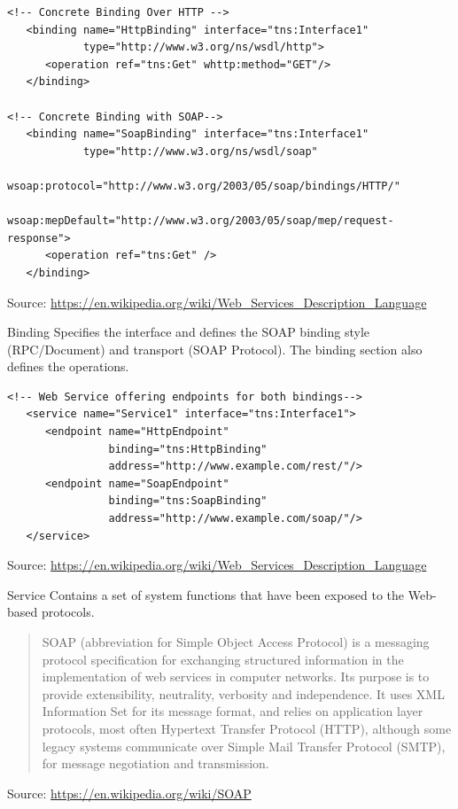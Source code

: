 \documentclass[Screen16to9,17pt]{foils}
\begin{document}

\begin{verbatim}
<!-- Concrete Binding Over HTTP -->
   <binding name="HttpBinding" interface="tns:Interface1"
            type="http://www.w3.org/ns/wsdl/http">
      <operation ref="tns:Get" whttp:method="GET"/>
   </binding>

<!-- Concrete Binding with SOAP-->
   <binding name="SoapBinding" interface="tns:Interface1"
            type="http://www.w3.org/ns/wsdl/soap"
            wsoap:protocol="http://www.w3.org/2003/05/soap/bindings/HTTP/"
            wsoap:mepDefault="http://www.w3.org/2003/05/soap/mep/request-response">
      <operation ref="tns:Get" />
   </binding>
\end{verbatim}
Source: \url{https://en.wikipedia.org/wiki/Web_Services_Description_Language}

Binding	Specifies the interface and defines the SOAP binding style (RPC/Document) and transport (SOAP Protocol). The binding section also defines the operations.


\begin{verbatim}
<!-- Web Service offering endpoints for both bindings-->
   <service name="Service1" interface="tns:Interface1">
      <endpoint name="HttpEndpoint"
                binding="tns:HttpBinding"
                address="http://www.example.com/rest/"/>
      <endpoint name="SoapEndpoint"
                binding="tns:SoapBinding"
                address="http://www.example.com/soap/"/>
   </service>
\end{verbatim}
Source: \url{https://en.wikipedia.org/wiki/Web_Services_Description_Language}

Service	Contains a set of system functions that have been exposed to the Web-based protocols.



\begin{quote}
SOAP (abbreviation for Simple Object Access Protocol) is a messaging protocol specification for exchanging structured information in the implementation of web services in computer networks. Its purpose is to provide extensibility, neutrality, verbosity and independence. It uses XML Information Set for its message format, and relies on application layer protocols, most often Hypertext Transfer Protocol (HTTP), although some legacy systems communicate over Simple Mail Transfer Protocol (SMTP), for message negotiation and transmission.
\end{quote}
Source: \url{https://en.wikipedia.org/wiki/SOAP}
\end{document}
